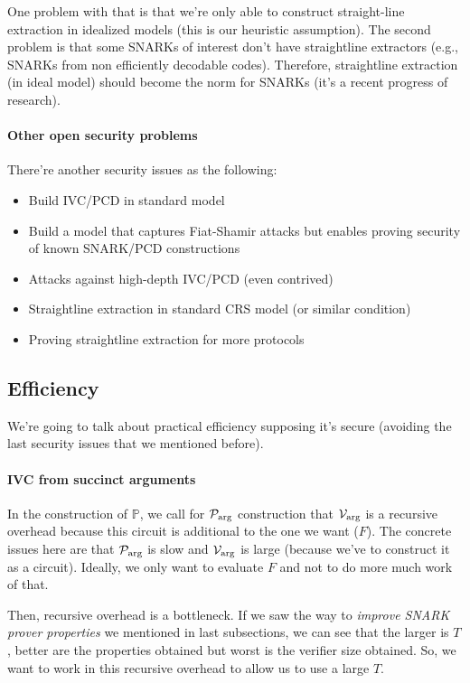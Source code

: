   One problem with that is that we're only able to construct straight-line extraction in idealized models
  (this is our heuristic assumption).
  The second problem is that some SNARKs of interest don't have straightline extractors
  (e.g., SNARKs from non efficiently decodable codes).
  Therefore, straightline extraction (in ideal model) should become the norm for SNARKs
  (it's a recent progress of research).

  \paragraph{Other open security problems}
  There're another security issues as the following:
  \begin{itemize}
    \item Build IVC/PCD in standard model 
    \item Build a model that captures Fiat-Shamir attacks but enables proving security of 
      known SNARK/PCD constructions 
    \item Attacks against high-depth IVC/PCD (even contrived)
    \item Straightline extraction in standard CRS model (or similar condition)
    \item Proving straightline extraction for more protocols
  \end{itemize}

  \subsection{Efficiency}
  We're going to talk about practical efficiency supposing it's secure (avoiding the last 
  security issues that we mentioned before).

  \paragraph{IVC from succinct arguments}
  In the construction of $\mathbb{P}$, we call for $\mathcal{P}_{\text{arg}}$ construction that 
  $\mathcal{V}_{\text{arg}}$ is a recursive overhead because this circuit is additional to the 
  one we want ($F$).
  The concrete issues here are that $\mathcal{P}_{\text{arg}}$ is slow and $\mathcal{V}_{\text{arg}}$ is large 
  (because we've to construct it as a circuit).
  Ideally, we only want to evaluate $F$ and not to do more much work of that.

  Then, recursive overhead is a bottleneck.
  If we saw the way to \textit{improve SNARK prover properties} we mentioned in last 
  subsections, we can see that the larger is $T$, better are the properties obtained 
  but worst is the verifier size obtained.
  So, we want to work in this recursive overhead to allow us to use a large $T$.

